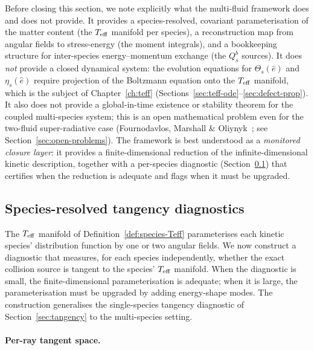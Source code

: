 Before closing this section, we note explicitly what the
multi-fluid framework does and does not provide.  It
provides a species-resolved, covariant parameterisation
of the matter content (the $T_{\mathrm{eff}}$ manifold per species),
a reconstruction map from angular fields to stress-energy
(the moment integrals), and a bookkeeping structure for
inter-species energy--momentum exchange (the $Q_s^b$
sources).  It does \emph{not} provide a closed dynamical
system: the evolution equations for $\Theta_s(\hat{e})$
and $\eta_s(\hat{e})$ require projection of the
Boltzmann equation onto the $T_{\mathrm{eff}}$ manifold, which is
the subject of Chapter~\ref{ch:teff}
(Sections~\ref{sec:teff-ode}--\ref{sec:defect-prop}).
It also does not provide a global-in-time existence or
stability theorem for the coupled multi-species system;
this is an open mathematical problem even for the
two-fluid super-radiative case
(Fournodavlos, Marshall \&
Oliynyk~\cite{FournodavlosMarshallOliynyk2025};
see Section~\ref{sec:open-problems}).
The framework is best understood as a \emph{monitored
closure layer}: it provides a finite-dimensional
reduction of the infinite-dimensional kinetic
description, together with a per-species diagnostic
(Section~\ref{sec:species-tangency}) that certifies when
the reduction is adequate and flags when it must be
upgraded.


\subsection{Species-resolved tangency diagnostics}
\label{sec:species-tangency}

The $T_{\mathrm{eff}}$ manifold of
Definition~\ref{def:species-Teff} parameterises each
kinetic species' distribution function by one or two
angular fields.  We now construct a diagnostic that
measures, for each species independently, whether the
exact collision source is tangent to the species' $T_{\mathrm{eff}}$
manifold.  When the diagnostic is small, the
finite-dimensional parameterisation is adequate; when it
is large, the parameterisation must be upgraded by adding
energy-shape modes.  The construction generalises the
single-species tangency diagnostic of
Section~\ref{sec:tangency} to the multi-species setting.


\paragraph{Per-ray tangent space.}

